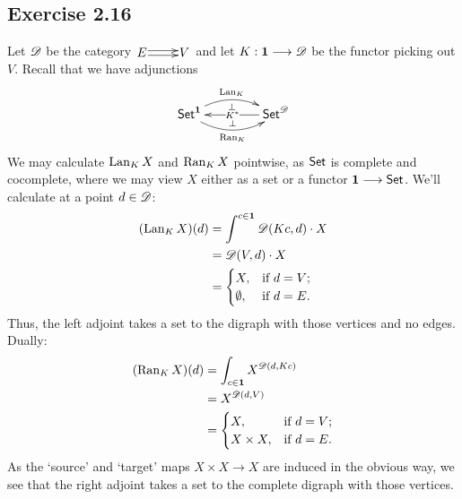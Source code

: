 \documentclass[11pt]{article}
\begin{document}
\begin{solutions}
\subsection*{Exercise 2.16}
Let $\mathscr{D}$ be the category 
$\vcenter{\xymatrix@1{
E
\ar@<-.35ex>[r]
\ar@<.5ex>[r]
&%
V%
}}$
and let $K:\textbf{1}\longrightarrow \mathscr{D}$ be the functor picking out $V$. Recall that we have adjunctions
\[\xymatrix@C=1.5cm{
\Set^\textbf{1}\ar@/^1.2em/[r]^-{\Lan_K}_-{\perp} \ar@/_1.2em/[r]_-{\Ran_K}^-{\perp}&%
\Set^\scrD\ar[l]|{K^*}%
}\]
We may calculate $\operatorname{Lan}_KX$ and $\operatorname{Ran}_KX$ pointwise, as $\operatorname{{\mathsf{Set}}}$ is complete and cocomplete, where we may view $X$ either as a set or a functor $\textbf{1}\longrightarrow\operatorname{{\mathsf{Set}}}$. We'll calculate at a point $d\in\mathscr{D}$:
\begin{alignat*}{2}
(\Lan_KX)(d)
&=
\int^{c\in\textbf{1}}\scrD(Kc,d)\cdot X%
\\
&=
\scrD(V,d)\cdot X%
\\
&=
\begin{cases}
X,&\textup{if }d=V;\\
\emptyset,&\textup{if }d=E.
\end{cases}
\end{alignat*}
Thus, the left adjoint takes a set to the digraph with those vertices and no edges. Dually:
\begin{alignat*}{2}
(\Ran_KX)(d)
&=
\int_{c\in\textbf{1}}X^{\scrD(d,Kc)}%
\\
&=
X^{\scrD(d,V)}%
\\
&=
\begin{cases}
X,&\textup{if }d=V;\\
X\times X,&\textup{if }d=E.
\end{cases}
\end{alignat*}
As the `source' and `target' maps $X\times X\to X$ are induced in the obvious way, we see that the right adjoint takes a set to the complete digraph with those vertices.
\end{solutions}
\end{document}

